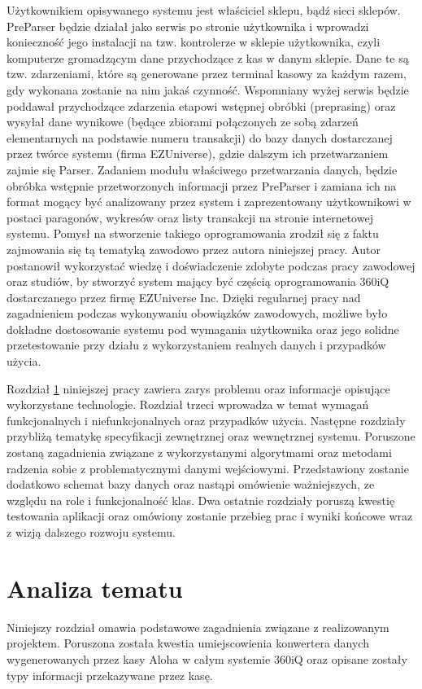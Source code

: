 \documentclass[a4paper]{book}
\begin{document}
Użytkownikiem opisywanego systemu jest właściciel sklepu, bądź sieci sklepów. PreParser będzie działał jako serwis po stronie użytkownika i wprowadzi konieczność jego instalacji na tzw. kontrolerze w sklepie użytkownika, czyli komputerze gromadzącym dane przychodzące z kas w danym sklepie. Dane te są tzw. zdarzeniami, które są generowane przez terminal kasowy za każdym razem, gdy wykonana zostanie na nim jakaś czynność. Wspomniany wyżej serwis będzie poddawał przychodzące zdarzenia etapowi wstępnej obróbki (preprasing) oraz wysyłał dane wynikowe (będące zbiorami połączonych ze sobą zdarzeń elementarnych na podstawie numeru transakcji) do bazy danych dostarczanej przez twórce systemu (firma EZUniverse), gdzie dalszym ich przetwarzaniem zajmie się Parser. Zadaniem modułu właściwego przetwarzania danych, będzie obróbka wstępnie przetworzonych informacji przez PreParser i zamiana ich na format mogący być analizowany przez system i zaprezentowany użytkownikowi w postaci paragonów, wykresów oraz listy transakcji na stronie internetowej systemu. Pomysł na stworzenie takiego oprogramowania zrodził się z faktu zajmowania się tą tematyką zawodowo przez autora niniejszej pracy. Autor postanowił wykorzystać wiedzę i doświadczenie zdobyte podczas pracy zawodowej oraz studiów, by stworzyć system mający być częścią oprogramowania 360iQ dostarczanego przez firmę EZUniverse Inc. Dzięki regularnej pracy nad zagadnieniem podczas wykonywaniu obowiązków zawodowych, możliwe było dokładne dostosowanie systemu pod wymagania użytkownika oraz jego solidne przetestowanie przy działu z wykorzystaniem realnych danych i przypadków użycia.

Rozdział \ref{rozdzial2} niniejszej pracy zawiera zarys problemu oraz informacje opisujące wykorzystane technologie. Rozdział trzeci wprowadza w temat wymagań funkcjonalnych i niefunkcjonalnych oraz przypadków użycia. Następne rozdziały przybliżą tematykę specyfikacji zewnętrznej oraz wewnętrznej systemu. Poruszone zostaną zagadnienia związane z wykorzystanymi algorytmami oraz metodami radzenia sobie z problematycznymi danymi wejściowymi. Przedstawiony zostanie dodatkowo schemat bazy danych oraz nastąpi omówienie ważniejszych, ze względu na role i funkcjonalność klas. Dwa ostatnie rozdziały poruszą kwestię testowania aplikacji oraz omówiony zostanie przebieg prac i wyniki końcowe wraz z wizją dalszego rozwoju systemu. 
\chapter{Analiza tematu}
\label{rozdzial2}
Niniejszy rozdział omawia podstawowe zagadnienia związane z realizowanym projektem. Poruszona została kwestia umiejscowienia konwertera danych wygenerowanych przez kasy Aloha w całym systemie 360iQ oraz opisane zostały typy informacji przekazywane przez kasę.
\end{document}
